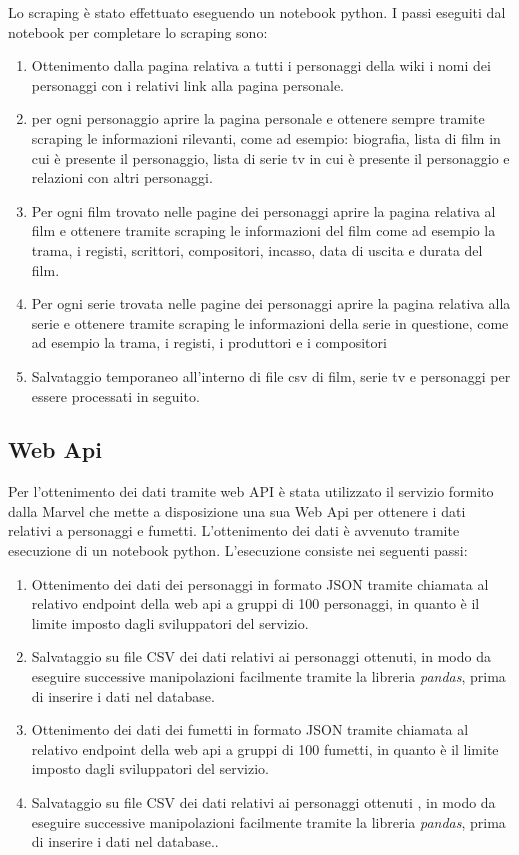 \documentclass[
12pt, %
a4paper, %
oneside, %
headinclude,footinclude, %
BCOR5mm, %
]{scrartcl}
\begin{document}
Lo scraping è stato effettuato eseguendo un notebook python.
I passi eseguiti dal notebook per completare lo scraping sono:
\begin{enumerate}
\item Ottenimento dalla pagina relativa a tutti i personaggi della wiki i nomi dei personaggi con i relativi link alla pagina personale.
\item per ogni personaggio aprire la pagina personale e ottenere sempre tramite scraping le informazioni rilevanti, come ad esempio: biografia, lista di film in cui è presente il personaggio, lista di serie tv in cui è presente il personaggio e relazioni con altri personaggi.
\item Per ogni film trovato nelle pagine dei personaggi aprire la pagina relativa al film e ottenere tramite scraping le informazioni del film come ad esempio la trama, i registi, scrittori, compositori, incasso, data di uscita e durata del film.
\item Per ogni serie trovata nelle pagine dei personaggi aprire la pagina relativa alla serie e ottenere tramite scraping le informazioni della serie in questione, come ad esempio la trama, i registi, i produttori e i compositori
\item Salvataggio temporaneo all'interno di file csv di film, serie tv e personaggi per essere processati in seguito.
\end{enumerate}

\subsection{Web Api}
Per l'ottenimento dei dati tramite web API è stata utilizzato il servizio formito dalla Marvel che mette a disposizione una sua Web Api per ottenere i dati relativi a personaggi e fumetti.
L'ottenimento dei dati è avvenuto tramite esecuzione di un notebook python.
L'esecuzione consiste nei seguenti passi:
\begin{enumerate}
\item Ottenimento dei dati dei personaggi in formato JSON tramite chiamata al relativo endpoint della web api a gruppi di 100 personaggi, in quanto è il limite imposto dagli sviluppatori del servizio.
\item Salvataggio su file CSV dei dati relativi ai personaggi ottenuti, in modo da eseguire successive manipolazioni facilmente tramite la libreria \textit{pandas}, prima di inserire i dati nel database.
\item Ottenimento dei dati dei fumetti in formato JSON tramite chiamata al relativo endpoint della web api a gruppi di 100 fumetti, in quanto è il limite imposto dagli sviluppatori del servizio.
\item Salvataggio su file CSV dei dati relativi ai personaggi ottenuti , in modo da eseguire successive manipolazioni facilmente tramite la libreria \textit{pandas}, prima di inserire i dati nel database..
\end{enumerate}
\end{document}
